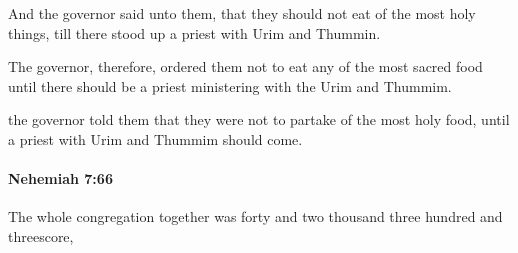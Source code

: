 			\begin{versebox}
					\item[BHS] 
					\item[LXX] 
					\item[ASV] And the governor said unto them, that they should not eat of the most holy things, till there stood up a priest with Urim and Thummin.
					\item[NIV] The governor, therefore, ordered them not to eat any of the most sacred food until there should be a priest ministering with the Urim and Thummim.
					\item[NRSV] the governor told them that they were not to partake of the most holy food, until a priest with Urim and Thummim should come.
			\end{versebox}

		\paragraph{Nehemiah 7:66} %
			\label{NEHEMIAH-7-66}

			The whole congregation together was forty and two thousand three hundred and threescore,

